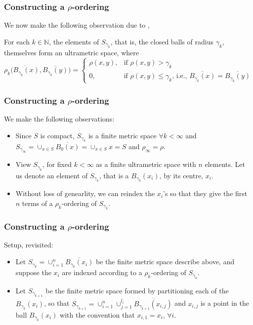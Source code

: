 \documentclass{beamer}
\theoremstyle{definition}
\begin{document}
\begin{frame}
\frametitle{Constructing a $\rho$-ordering}
We now make the following observation due to \cite{na},

\begin{lemma}
For each $k \in \mathbb{N}$, the elements of $S_{\gamma_k}$, that is, the closed balls of radius $\gamma_k$, themselves form an ultrametric space, where 
\[ \rho_k\overline{(B_{\gamma_k}(x)},\overline{B_{\gamma_k}(y)}) = 
\begin{cases}
\rho(x,y), & \text{if } \rho(x,y) > \gamma_k \\
0, & \text{if }   \rho(x,y) \leq \gamma_k \text{, i.e., } \overline{B_{\gamma_k}(x)}=\overline{B_{\gamma_k}(y)}
\end{cases}
\]
\end{lemma}
\end{frame}

\begin{frame}
\frametitle{Constructing a $\rho$-ordering}
We make the following observations:
\begin{itemize}
\item Since $S$ is  compact,  $S_{\gamma_k}$ is a finite metric space $\forall k < \infty$ and $S_{\gamma_\infty}=\cup_{x \in S}\overline{B_0(x)} = \cup_{x \in S}x=S$ and $\rho_\infty=\rho$. 
\item View $S_{\gamma_k}$, for fixed $k < \infty$ as a finite ultrametric space with $n$ elements. Let us denote an element of  $S_{\gamma_k}$, that is a $B_{\gamma_k}(x_i)$, by its centre, $x_i$. 
\item Without loss of genearlity, we can reindex the $x_i$'s so that they give the first $n$ terms of a $\rho_k$-ordering of $S_{\gamma_k}$.
\end{itemize}
\end{frame}	


\begin{frame}
\frametitle{Constructing a $\rho$-ordering}
Setup, revisited:
\begin{itemize}
\item Let $S_{\gamma_k} =  \cup_{i=1}^n \overline{B_{\gamma_k}(x_i)}$ be the finite metric space describe above, and suppose the $x_i$ are indexed according to a $\rho_k$-ordering of  $S_{\gamma_k}$.
\item Let  $S_{\gamma_{k+1}}$ be the finite metric space formed by partitioning each of the ${B_{\gamma_k}(x_i)}$, so that  $S_{\gamma_{k+1}} = \cup_{i=1}^n \cup_{j=1}^{l_i} \overline{B_{\gamma_{k+1}}(x_{i,j})}$ and $x_{i,j}$ is a point in the ball $B_{\gamma_k}(x_i)$ with the convention that $x_{i,1} = x_i$, $\forall i$. 
\end{itemize}
\end{frame}
\end{document}
